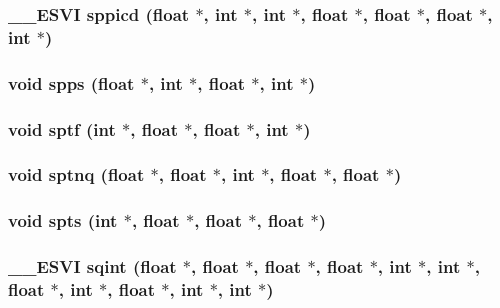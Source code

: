 \subsubsection{\setlength{\rightskip}{0pt plus 5cm}\_\-\_\-ESVI sppicd (float $\ast$, int $\ast$, int $\ast$, float $\ast$, float $\ast$, float $\ast$, int $\ast$)}\label{essl_8h_d60599ae1a0ba01f8c8d89d0600a782b}


\subsubsection{\setlength{\rightskip}{0pt plus 5cm}void spps (float $\ast$, int $\ast$, float $\ast$, int $\ast$)}\label{essl_8h_5d04e25ae38a7dabde018b4cc12acb75}


\subsubsection{\setlength{\rightskip}{0pt plus 5cm}void sptf (int $\ast$, float $\ast$, float $\ast$, int $\ast$)}\label{essl_8h_8bb2bb1cbccf76e45b19748911901f41}


\subsubsection{\setlength{\rightskip}{0pt plus 5cm}void sptnq (float $\ast$, float $\ast$, int $\ast$, float $\ast$, float $\ast$)}\label{essl_8h_cd63984fcb2f55bfdb65e277bbc5fe0f}


\subsubsection{\setlength{\rightskip}{0pt plus 5cm}void spts (int $\ast$, float $\ast$, float $\ast$, float $\ast$)}\label{essl_8h_996b1cff0362266d2e1f3f27c91036d1}


\subsubsection{\setlength{\rightskip}{0pt plus 5cm}\_\-\_\-ESVI sqint (float $\ast$, float $\ast$, float $\ast$, float $\ast$, int $\ast$, int $\ast$, float $\ast$, int $\ast$, float $\ast$, int $\ast$, int $\ast$)}\label{essl_8h_7ea44898a18acc46caccb2cb01e5fe79}


